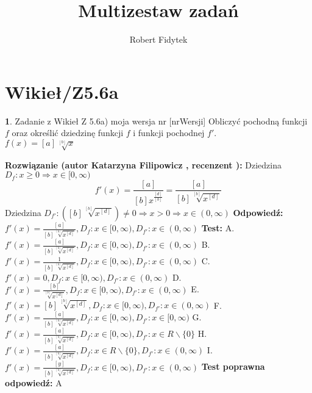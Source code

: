 \documentclass[12pt, a4paper]{article}
\title{Multizestaw zadań}
\author{Robert Fidytek}
\date{}
\theoremstyle{definition} %
\newtheorem{zad}{}
\newcommand{\kategoria}[1]{\section{#1}} %
\newcommand{\zadStart}[1]{\begin{zad}#1\newline} %
\newcommand{\zadStop}{\end{zad}}   %
\newcommand{\rozwStart}[2]{\noindent \textbf{Rozwiązanie (autor #1 , recenzent #2): }\newline} %
\newcommand{\rozwStop}{\newline}                                            %
\newcommand{\odpStart}{\noindent \textbf{Odpowiedź:}\newline}    %
\newcommand{\odpStop}{\newline}                                             %
\newcommand{\testStart}{\noindent \textbf{Test:}\newline} %
\newcommand{\testStop}{\newline} %
\newcommand{\kluczStart}{\noindent \textbf{Test poprawna odpowiedź:}\newline} %
\newcommand{\kluczStop}{\newline} %
\begin{document}
\maketitle


\kategoria{Wikieł/Z5.6a}
\zadStart{Zadanie z Wikieł Z 5.6a) moja wersja nr [nrWersji]}
Obliczyć pochodną funkcji $f$ oraz określić dziedzinę funkcji $f$ i funkcji pochodnej $f'$.\\
$f(x)=[a]\sqrt[[b]]{x}$
\zadStop
\rozwStart{Katarzyna Filipowicz}{}
Dziedzina $D_f: x \geq 0 \Rightarrow x \in [0,\infty)$
$$
f'(x)=\frac{[a]}{[b]x^{\frac{[d]}{[b]}}}=\frac{[a]}{[b] \sqrt[[b]]{x^{[d]}}}
$$
Dziedzina $D_{f'}: ([b] \sqrt[[b]]{x^{[d]}}) \neq 0 \Rightarrow x > 0 \Rightarrow   x \in (0,\infty)$
\rozwStop
\odpStart
$f'(x)=\frac{[a]}{[b] \sqrt[[b]]{x^{[d]}}},  D_{f}:x \in [0,\infty), D_{f'}:x \in (0,\infty)$
\odpStop
\testStart
A.$f'(x)=\frac{[a]}{[b] \sqrt[[b]]{x^{[d]}}}, D_{f}:x \in [0,\infty), D_{f'}:x \in (0,\infty)$
B.$f'(x)=\frac{1}{[b] \sqrt[[b]]{x^{[d]}}}, D_{f}:x \in [0,\infty), D_{f'}:x \in (0,\infty)$
C.$f'(x)=0, D_{f}:x \in [0,\infty), D_{f'}:x \in (0,\infty)$
D.$f'(x)=\frac{[b]}{ \sqrt[[b]]{x^{[d]}}}, D_{f}:x \in [0,\infty), D_{f'}:x \in (0,\infty)$
E.$f'(x)=[b] \sqrt[[b]]{x^{[d]}}, D_{f}:x \in [0,\infty), D_{f'}:x \in (0,\infty)$
F.$f'(x)=\frac{[a]}{[b] \sqrt[[b]]{x^{[d]}}}, D_{f}:x \in [0,\infty), D_{f'}:x \in [0,\infty)$
G.$f'(x)=\frac{[a]}{[b] \sqrt[[b]]{x^{[d]}}}, D_{f}:x \in [0,\infty), D_{f'}:x \in R\backslash \{0\}$
H.$f'(x)=\frac{[a]}{[b] \sqrt[[b]]{x^{[d]}}}, D_{f}:x \in R\backslash \{0\}, D_{f'}:x \in (0,\infty)$
I.$f'(x)=\frac{[y]}{[b] \sqrt[[b]]{x^{[d]}}}, D_{f}:x \in [0,\infty), D_{f'}:x \in (0,\infty)$
\testStop
\kluczStart
A
\kluczStop
\end{document}
